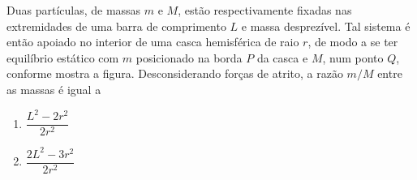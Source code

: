 \begin{exemplo}\label{exemplo_dinamicarotacao_teorema3forcasex03}

Duas partículas, de massas $m$ e $M$, estão respectivamente fixadas nas extremidades de uma barra de comprimento $L$ e massa desprezível. Tal sistema é então apoiado no interior de uma casca hemisférica de raio $r$, de modo a se ter equilíbrio estático com $m$ posicionado na borda $P$ da casca e $M$, num ponto $Q$, conforme mostra a figura. Desconsiderando forças de atrito, a razão $m/M$ entre as massas é igual a

\vspace{0.5cm}

\begin{center}
\end{center}

\vspace{0.4cm}

\begin{enumerate}
    \item[(a)] $\dfrac{L^2-2r^2}{2r^2}$
    
    \item[(b)] $\dfrac{2L^2-3r^2}{2r^2}$
    

\end{enumerate}
\end{exemplo}
